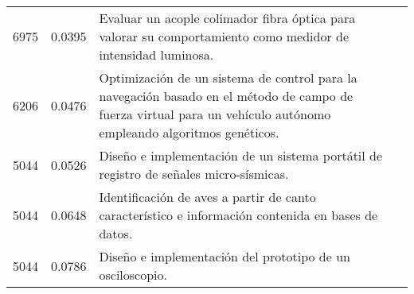 \begin{table}[H]\centering
\label{tab:tablae2}
	\begin{tabularx}{\textwidth}{XXXm{3.0cm}}\toprule

6975&0.0395&Evaluar un acople colimador fibra óptica para valorar su comportamiento como medidor de intensidad luminosa. \\
6206&0.0476&Optimización de un sistema de control para la navegación basado en el método de campo de fuerza virtual para un vehículo autónomo empleando algoritmos genéticos.\\
5044&0.0526&Diseño e implementación de un sistema portátil de registro de señales micro-sísmicas. \\
5044&0.0648&Identificación de aves a partir de canto característico e información contenida en bases de datos. \\
5044&0.0786&Diseño e implementación del prototipo de un osciloscopio. \\

 \bottomrule
	\end{tabularx}
	
\end{table}


